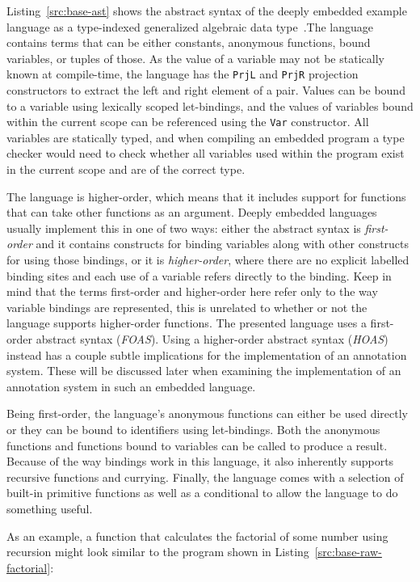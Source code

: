 \documentclass[fontsize=11pt,a4paper,parskip=half,numbers=noenddot]{scrartcl}
\newcommand{\hask}[1]{\texttt{#1}}
\begin{document}
Listing~\ref{src:base-ast} shows the abstract syntax of the deeply embedded
example language as a type-indexed generalized algebraic data
type~\cite{xi2003guarded}.\@ The language contains terms that can be either
constants, anonymous functions, bound variables, or tuples of those. As the
value of a variable may not be statically known at compile-time, the language
has the \hask{PrjL} and \hask{PrjR} projection constructors to extract the left
and right element of a pair. Values can be bound to a variable using lexically
scoped let-bindings, and the values of variables bound within the current scope
can be referenced using the \hask{Var} constructor. All variables are statically
typed, and when compiling an embedded program a type checker would need to check
whether all variables used within the program exist in the current scope and are
of the correct type.

The language is higher-order, which means that it includes support for functions
that can take other functions as an argument. Deeply embedded languages usually
implement this in one of two ways: either the abstract syntax is
\emph{first-order} and it contains constructs for binding variables along with
other constructs for using those bindings, or it is \emph{higher-order}, where
there are no explicit labelled binding sites and each use of a variable refers
directly to the binding. Keep in mind that the terms first-order and
higher-order here refer only to the way variable bindings are represented, this
is unrelated to whether or not the language supports higher-order functions. The
presented language uses a first-order abstract syntax (\emph{FOAS}). Using a
higher-order abstract syntax (\emph{HOAS}) instead has a couple subtle
implications for the implementation of an annotation system. These will be
discussed later when examining the implementation of an annotation system in
such an embedded language.

Being first-order, the language's anonymous functions can either be used
directly or they can be bound to identifiers using let-bindings. Both the
anonymous functions and functions bound to variables can be called to produce a
result. Because of the way bindings work in this language, it also inherently
supports recursive functions and currying. Finally, the language comes with a
selection of built-in primitive functions as well as a conditional to allow the
language to do something useful.

As an example, a function that calculates the factorial of some number using
recursion might look similar to the program shown in
Listing~\ref{src:base-raw-factorial}:
\end{document}
